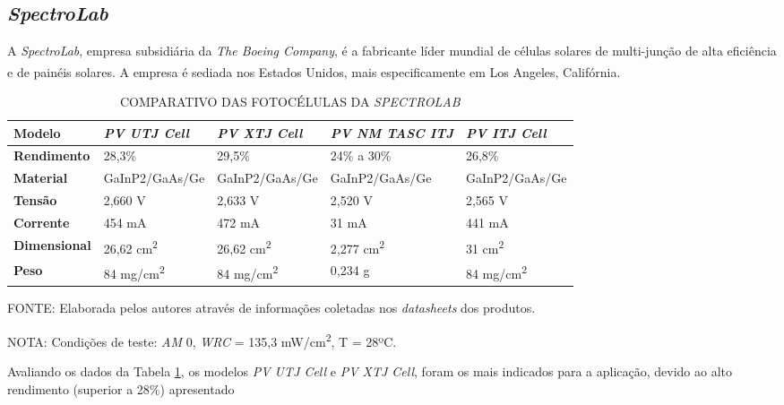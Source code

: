 \documentclass[
	12pt,				%
	openright,			%
	oneside,			%
	a4paper,			%
	english,			%
	french,				%
	spanish,			%
	brazil,				%
	oldfontcommands
	]{abntex2}
\begin{document}
\subsection[SpectroLab]{\textit{SpectroLab}}
	
	A \textit{SpectroLab}, empresa subsidiária da \textit{The Boeing Company}, é a fabricante líder mundial de células solares de multi-junção de alta eficiência e de painéis solares. A empresa é sediada nos Estados Unidos, mais especificamente em Los Angeles, Califórnia.\textsuperscript{\cite{SpectroLab}}
	
	\begin{table}[th]
	\caption{COMPARATIVO DAS FOTOCÉLULAS DA \textit{SPECTROLAB}}
	\label{Tab_Spectro_Comp}
	\begin{tabular}{p{2.5cm}|p{3.1cm}|p{3.1cm}|p{3.1cm}|p{3.1cm}}
		\textbf{Modelo} & \textit{\textbf{PV UTJ Cell}} & \textit{\textbf{PV XTJ Cell}} & \textit{\textbf{PV NM TASC ITJ}} & \textit{\textbf{PV ITJ Cell}} \\
		\hline
		\textbf{Rendimento} & 28,3\% & 29,5\% & 24\% a 30\% & 26,8\% \\
		\hline
		\textbf{Material} & GaInP2/GaAs/Ge & GaInP2/GaAs/Ge & GaInP2/GaAs/Ge & GaInP2/GaAs/Ge\\
		\hline
		\textbf{Tensão} & 2,660 V & 2,633 V & 2,520 V & 2,565 V\\
		\hline
		\textbf{Corrente} & 454 mA & 472 mA & 31 mA & 441 mA\\
		\hline
		\textbf{Dimensional} & 26,62 cm\textsuperscript{2} & 26,62 cm\textsuperscript{2} & 2,277 cm\textsuperscript{2} & 31 cm\textsuperscript{2}\\
		\hline
		\textbf{Peso} & 84 mg/cm\textsuperscript{2} & 84 mg/cm\textsuperscript{2} & 0,234 g & 84 mg/cm\textsuperscript{2}\\
	\end{tabular}
	
	\begin{small}
	\vspace{3pt}
		FONTE: Elaborada pelos autores através de informações coletadas nos \textit{datasheets} dos produtos.
	\end{small}
	\begin{footnotesize}
		NOTA: Condições de teste: \textit{AM} 0, \textit{WRC} = 135,3 mW/cm\textsuperscript{2}, T = 28ºC.
	\end{footnotesize}
	\end{table}
	\pagebreak

	Avaliando os dados da Tabela \ref{Tab_Spectro_Comp}, os modelos \textit{PV UTJ Cell} e \textit{PV XTJ Cell}, foram os mais indicados para a aplicação, devido ao alto rendimento (superior a 28\%) apresentado
	
\end{document}
